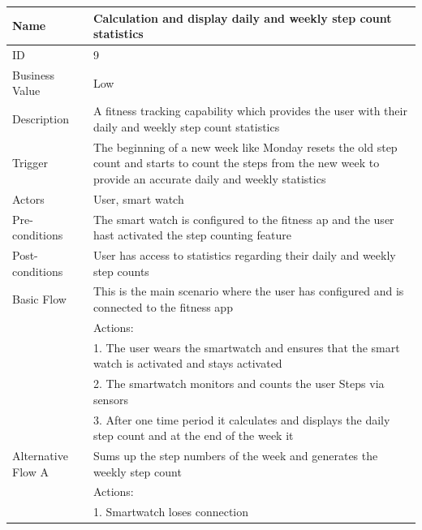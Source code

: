 \documentclass{article}
\begin{document}
		\begin{table}[h]
			\centering
			\captionsetup{labelformat=empty}
			\begin{tabularx}{\textwidth}{|>{\raggedright\arraybackslash}p{}|X|}
				\hline
				Name             & Calculation and display daily and weekly step count statistics                                \\ \hline
				ID               & 9                                                                                       \\ \hline
				Business Value   & Low                                                                                    \\ \hline
				Description      & A fitness tracking capability which provides the user with their daily and weekly step count statistics \\ \hline
				Trigger          & The beginning of a new week like Monday resets the old step count and starts to count the steps from the new week to provide an accurate daily and weekly statistics \\ \hline
				Actors           & User, smart watch                                 \\ \hline
				Pre-conditions   & The smart watch is configured to the fitness ap and the user hast activated the step counting feature                                    \\ \hline
				Post-conditions  & User has access to statistics regarding their daily and weekly step counts                                                         \\ \hline
				Basic Flow       & This is the main scenario where the user has configured and is connected to the fitness app \\ \hline
								 & Actions: \\
								 & 1. The user wears the smartwatch and ensures that the smart watch is activated and stays activated \\
								 & 2. The smartwatch monitors and counts the user Steps via sensors \\
								 & 3. After one time period it calculates and displays the daily step count and at the end of the week it \\ \hline
				Alternative Flow A & Sums up the step numbers of the week and generates the weekly step count \\
								 & Actions: \\
								 & 1. Smartwatch loses connection \\

\end{tabularx}
\end{table}
\end{document}
